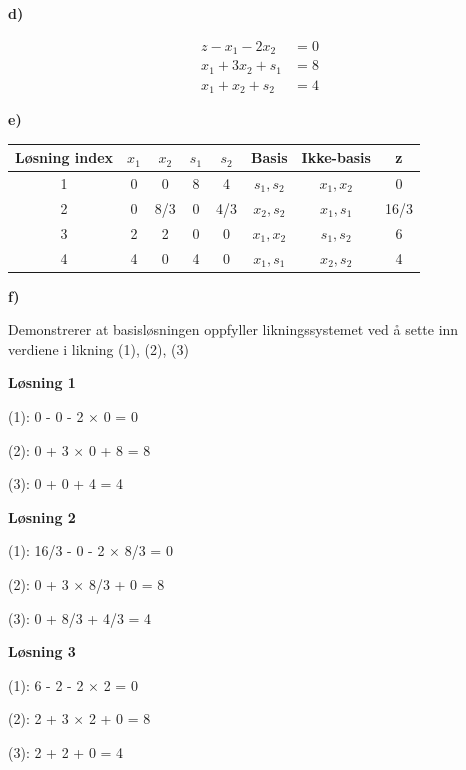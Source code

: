\documentclass{article}
\begin{document}
    \pagebreak\small\textbf{d)}

    \begin{align}
        z - x_1 - 2x_2 &= 0 \\ 
        x_1 + 3x_2 + s_1 &= 8 \\
        x_1 + x_2 + s_2 &= 4
    \end{align}

    \small\textbf{e)}
    
    \begin{table}[h!]
        \centering
        \begin{tabular}{|c|c|c|c|c|c|c|c|}
            \hline
            Løsning index & $x_1$ & $x_2 $ & $s_1$ & $s_2$ & Basis & Ikke-basis & z \\\hline
            1 & 0 & 0 & 8 & 4 & $s_1, s_2$ & $x_1, x_2$ & 0 \\\hline
            2 & 0 & 8/3 & 0 & 4/3 & $x_2, s_2$ & $x_1, s_1$ & 16/3 \\\hline
            3 & 2 & 2 & 0 & 0 & $x_1, x_2$ & $s_1, s_2$ & 6 \\\hline
            4 & 4 & 0 & 4 & 0 & $x_1, s_1$ & $x_2, s_2$ & 4 \\\hline
        \end{tabular}
    \end{table}

    \small\textbf{f)}
    
    Demonstrerer at basisløsningen oppfyller likningssystemet ved å sette inn verdiene i likning (1), (2), (3)
    
    \vspace*{12pt}\textbf{Løsning 1}
    
    (1): 0 - 0 - 2 $\times$ 0 = 0
    
    (2): 0 + 3 $\times$ 0 + 8 = 8
    
    (3): 0 + 0 + 4 = 4
    
    \vspace*{12pt}\textbf{Løsning 2}
    
    (1): 16/3 - 0 - 2 $\times$ 8/3 = 0

    (2): 0 + 3 $\times$ 8/3 + 0 = 8
    
    (3): 0 + 8/3 + 4/3 = 4
    
    \vspace*{12pt}\textbf{Løsning 3}
    
    (1): 6 - 2 - 2 $\times$ 2 = 0
    
    (2): 2 + 3 $\times$ 2 + 0 = 8
    
    (3): 2 + 2 + 0 = 4
    
\end{document}
